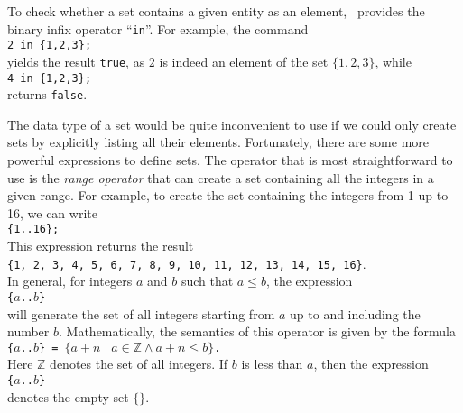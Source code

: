 To check whether a set contains a given entity as an element, \setlx\ provides the binary infix
operator ``\texttt{in}''.  For example, the command
\\[0.2cm]
\hspace*{1.3cm}
\texttt{2 in \{1,2,3\};}
\\[0.2cm]
yields the result \texttt{true}, as $2$ is indeed an element of the set $\{1,2,3\}$, while 
\\[0.2cm]
\hspace*{1.3cm}
\texttt{4 in \{1,2,3\};}
\\[0.2cm]
 returns \texttt{false}.

The data type of a set would be quite inconvenient to use if we could only create sets by
explicitly listing all their elements.  Fortunately, there are some more powerful expressions to
define sets.  The operator that is most straightforward to use is the \emph{range operator} that can create a set
containing all the integers in a given range.  For example, to create the set containing
the integers from 1 up to 16, we can write 
\\[0.2cm]
\hspace*{1.3cm}
\texttt{\{1..16\};}
\\[0.2cm]
This expression returns the result
\\[0.2cm]
\hspace*{1.3cm}
\texttt{\{1, 2, 3, 4, 5, 6, 7, 8, 9, 10, 11, 12, 13, 14, 15, 16\}}.
\\[0.2cm]
In general, for integers $a$ and $b$
such that $a \leq b$,
the expression
\\[0.2cm]
\hspace*{1.3cm}
\texttt{\{$a$..$b$\}}
\\[0.2cm]
will generate the set of all integers starting from $a$ up to and including the number
$b$.  Mathematically, the semantics of this operator is  given by the formula
\\[0.2cm]
\hspace*{1.3cm}
\texttt{\{$a$..$b$\} = $\{ a + n \mid a \in \mathbb{Z} \wedge a + n \leq b\}$.}
\\[0.2cm]
Here $\mathbb{Z}$ denotes the set of all integers.
If $b$ is less than $a$, then the expression 
\\[0.2cm]
\hspace*{1.3cm}
\texttt{\{$a$..$b$\}}
\\[0.2cm]
denotes the empty set $\{\}$.

